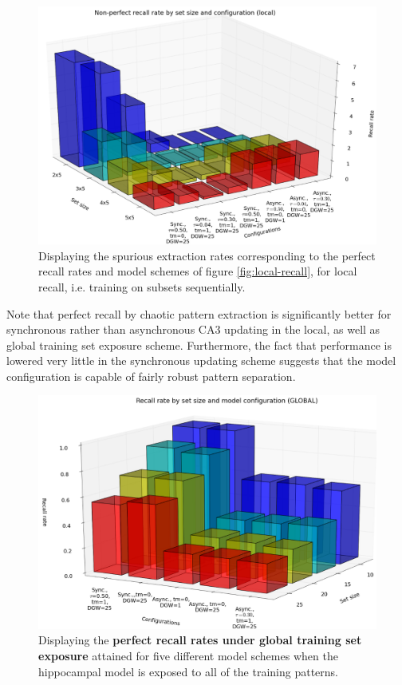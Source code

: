 \begin{figure}
    \centering
    \includegraphics[width=14cm]{fig/i-iters/local-recall-spurious}
    \caption{Displaying the spurious extraction rates corresponding to the perfect recall rates and model schemes of figure \ref{fig:local-recall}, for local recall, i.e. training on subsets sequentially.}
    \label{fig:local-recall-spurious}
\end{figure}

Note that perfect recall by chaotic pattern extraction is significantly better for synchronous rather than asynchronous CA3 updating in the local, as well as global training set exposure scheme. Furthermore, the fact that performance is lowered very little in the synchronous updating scheme suggests that the model configuration is capable of fairly robust pattern separation.

\begin{figure}
    \centering
    \includegraphics[width=13cm]{fig/i-iters/global-recall}
    \caption{Displaying the \textbf{perfect recall rates under global training set exposure} attained for five different model schemes when the hippocampal model is exposed to all of the training patterns.}
    \label{fig:global-recall}
\end{figure}

